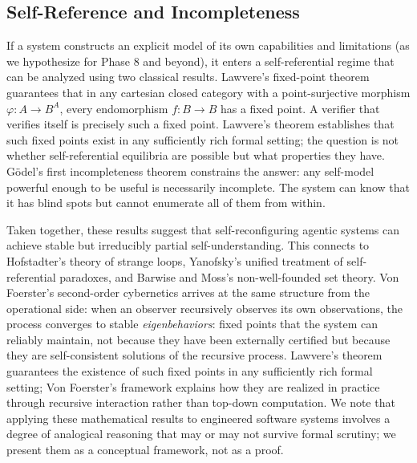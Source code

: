 \subsection{Self-Reference and Incompleteness}

If a system constructs an explicit model of its own capabilities and limitations (as we hypothesize for Phase 8 and beyond), it enters a self-referential regime that can be analyzed using two classical results. Lawvere's fixed-point theorem \cite{lawvere1969} guarantees that in any cartesian closed category with a point-surjective morphism $\varphi: A \to B^A$, every endomorphism $f: B \to B$ has a fixed point. A verifier that verifies itself is precisely such a fixed point. Lawvere's theorem establishes that such fixed points exist in any sufficiently rich formal setting; the question is not whether self-referential equilibria are possible but what properties they have. G\"odel's first incompleteness theorem \cite{godel1931} constrains the answer: any self-model powerful enough to be useful is necessarily incomplete. The system can know that it has blind spots but cannot enumerate all of them from within.

Taken together, these results suggest that self-reconfiguring agentic systems can achieve stable but irreducibly partial self-understanding. This connects to Hofstadter's \cite{hofstadter1979} theory of strange loops, Yanofsky's \cite{yanofsky2003} unified treatment of self-referential paradoxes, and Barwise and Moss's \cite{barwise1996} non-well-founded set theory. Von Foerster's \cite{vonfoerster2003} second-order cybernetics arrives at the same structure from the operational side: when an observer recursively observes its own observations, the process converges to stable \emph{eigenbehaviors}: fixed points that the system can reliably maintain, not because they have been externally certified but because they are self-consistent solutions of the recursive process. Lawvere's theorem guarantees the existence of such fixed points in any sufficiently rich formal setting; Von Foerster's framework explains how they are realized in practice through recursive interaction rather than top-down computation. We note that applying these mathematical results to engineered software systems involves a degree of analogical reasoning that may or may not survive formal scrutiny; we present them as a conceptual framework, not as a proof.


